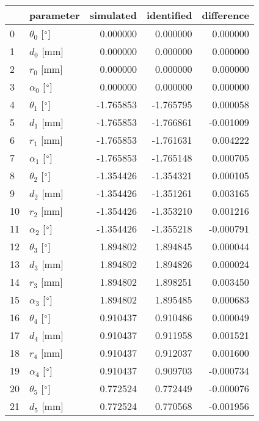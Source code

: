 \documentclass{standalone}%
\begin{document}
%
\normalsize%
\begin{tabular}{llrrr}
\toprule
{} &                 parameter & simulated & identified & difference \\
\midrule
0  &  $\theta_{0}$ [$\degree$] &  0.000000 &   0.000000 &   0.000000 \\
1  &              $d_{0}$ [mm] &  0.000000 &   0.000000 &   0.000000 \\
2  &              $r_{0}$ [mm] &  0.000000 &   0.000000 &   0.000000 \\
3  &  $\alpha_{0}$ [$\degree$] &  0.000000 &   0.000000 &   0.000000 \\
4  &  $\theta_{1}$ [$\degree$] & -1.765853 &  -1.765795 &   0.000058 \\
5  &              $d_{1}$ [mm] & -1.765853 &  -1.766861 &  -0.001009 \\
6  &              $r_{1}$ [mm] & -1.765853 &  -1.761631 &   0.004222 \\
7  &  $\alpha_{1}$ [$\degree$] & -1.765853 &  -1.765148 &   0.000705 \\
8  &  $\theta_{2}$ [$\degree$] & -1.354426 &  -1.354321 &   0.000105 \\
9  &              $d_{2}$ [mm] & -1.354426 &  -1.351261 &   0.003165 \\
10 &              $r_{2}$ [mm] & -1.354426 &  -1.353210 &   0.001216 \\
11 &  $\alpha_{2}$ [$\degree$] & -1.354426 &  -1.355218 &  -0.000791 \\
12 &  $\theta_{3}$ [$\degree$] &  1.894802 &   1.894845 &   0.000044 \\
13 &              $d_{3}$ [mm] &  1.894802 &   1.894826 &   0.000024 \\
14 &              $r_{3}$ [mm] &  1.894802 &   1.898251 &   0.003450 \\
15 &  $\alpha_{3}$ [$\degree$] &  1.894802 &   1.895485 &   0.000683 \\
16 &  $\theta_{4}$ [$\degree$] &  0.910437 &   0.910486 &   0.000049 \\
17 &              $d_{4}$ [mm] &  0.910437 &   0.911958 &   0.001521 \\
18 &              $r_{4}$ [mm] &  0.910437 &   0.912037 &   0.001600 \\
19 &  $\alpha_{4}$ [$\degree$] &  0.910437 &   0.909703 &  -0.000734 \\
20 &  $\theta_{5}$ [$\degree$] &  0.772524 &   0.772449 &  -0.000076 \\
21 &              $d_{5}$ [mm] &  0.772524 &   0.770568 &  -0.001956 \\

\end{tabular}
\end{document}
